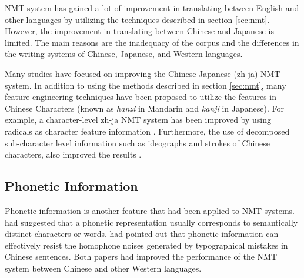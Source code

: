 NMT system has gained a lot of improvement in translating between English and other languages by utilizing the techniques described in section \ref{sec:nmt}. However, the improvement in translating between Chinese and Japanese is limited. The main reasons are the inadequacy of the corpus and the differences in the writing systems of Chinese, Japanese, and Western languages.

Many studies have focused on improving the Chinese-Japanese (zh-ja) NMT system. In addition to using the methods \cite{imamura2018enhancement, chu2017empirical, zhang2020parallel} described in section \ref{sec:nmt}, many feature engineering techniques have been proposed to utilize the features in Chinese Characters (known as \textit{hanzi} in Mandarin and \textit{kanji} in Japanese). For example, a character-level zh-ja NMT system has been improved by using radicals as character feature information \cite{8300572}. Furthermore, the use of decomposed sub-character level information such as ideographs and strokes of Chinese characters, also improved the results \cite{zhang-komachi-2018-neural}.

\subsection{Phonetic Information} \label{sec:phonetic}

Phonetic information is another feature that had been applied to NMT systems. \cite{khan2019diversity} had suggested that a phonetic representation usually corresponds to semantically distinct characters or words. \cite{liu-etal-2019-robust} had pointed out that phonetic information can effectively resist the homophone noises generated by typographical mistakes in Chinese sentences. Both papers had improved the performance of the NMT system between Chinese and other Western languages.

